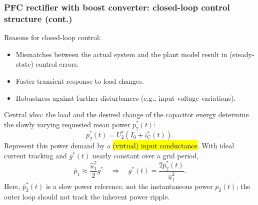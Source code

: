 \begin{frame}
	\frametitle{PFC rectifier with boost converter: closed-loop control structure (cont.)}
	Reasons for closed-loop control:
	\begin{itemize}
		\item Mismatches between the actual system and the plant model result in (steady-state) control errors.\pause
		\item Faster transient response to load changes.\pause
		\item Robustness against further disturbances (e.g., input voltage variations).
	\end{itemize}\pause
	Central idea: the load and the desired change of the capacitor energy determine the slowly varying requested mean power $\overline{p}_2^*(t)$:
	$$
		\overline{p}_2^*(t)=U_2^*\left(I_0+i_\mathrm{C}^*(t)\right).
	$$\pause
	Represent this power demand by a \hl{(virtual) input conductance}. With ideal current tracking and $g^*(t)$ nearly constant over a grid period,
	$$
		\overline{p}_1\approx \frac{\hat{u}_1^2}{2}g^*
		\quad\Rightarrow\quad
		g^*(t)=\frac{2\overline{p}_2^*(t)}{\hat{u}_1^2}.
	$$
	Here, $\overline{p}_2^*(t)$ is a slow power reference, not the instantaneous power $p_2(t)$; the outer loop should not track the inherent power ripple.
\end{frame}


